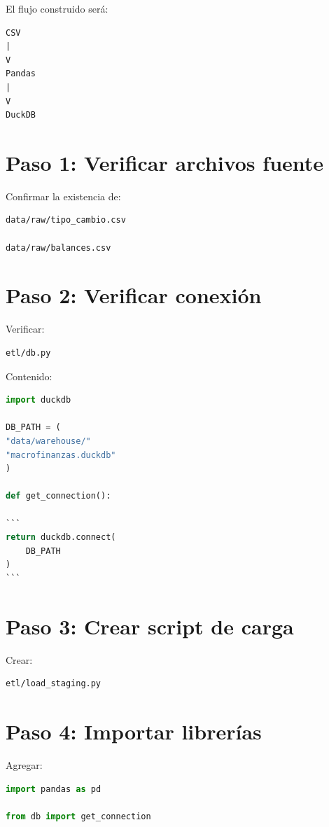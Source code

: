 El flujo construido será:

\begin{verbatim}
CSV
|
V
Pandas
|
V
DuckDB
\end{verbatim}

\section{Paso 1: Verificar archivos fuente}

Confirmar la existencia de:

\begin{verbatim}
data/raw/tipo_cambio.csv

data/raw/balances.csv
\end{verbatim}

\section{Paso 2: Verificar conexión}

Verificar:

\begin{verbatim}
etl/db.py
\end{verbatim}

Contenido:

\begin{lstlisting}[language=Python]
import duckdb

DB_PATH = (
"data/warehouse/"
"macrofinanzas.duckdb"
)

def get_connection():

```
return duckdb.connect(
    DB_PATH
)
```

\end{lstlisting}

\section{Paso 3: Crear script de carga}

Crear:

\begin{verbatim}
etl/load_staging.py
\end{verbatim}

\section{Paso 4: Importar librerías}

Agregar:

\begin{lstlisting}[language=Python]
import pandas as pd

from db import get_connection
\end{lstlisting}

